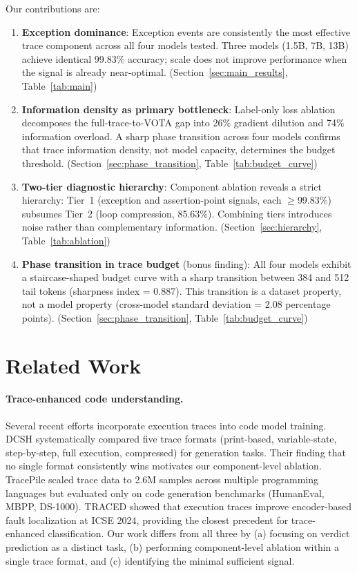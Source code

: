 \documentclass[11pt]{article}
\begin{document}
Our contributions are:
\begin{enumerate}
    \item \textbf{Exception dominance}: Exception events are consistently the most effective trace component across all four models tested. Three models (1.5B, 7B, 13B) achieve identical 99.83\% accuracy; scale does not improve performance when the signal is already near-optimal. (Section~\ref{sec:main_results}, Table~\ref{tab:main})
    \item \textbf{Information density as primary bottleneck}: Label-only loss ablation decomposes the full-trace-to-VOTA gap into 26\% gradient dilution and 74\% information overload. A sharp phase transition across four models confirms that trace information density, not model capacity, determines the budget threshold. (Section~\ref{sec:phase_transition}, Table~\ref{tab:budget_curve})
    \item \textbf{Two-tier diagnostic hierarchy}: Component ablation reveals a strict hierarchy: Tier~1 (exception and assertion-point signals, each $\geq$99.83\%) subsumes Tier~2 (loop compression, 85.63\%). Combining tiers introduces noise rather than complementary information. (Section~\ref{sec:hierarchy}, Table~\ref{tab:ablation})
    \item[\textbf{+}] \textbf{Phase transition in trace budget} (bonus finding): All four models exhibit a staircase-shaped budget curve with a sharp transition between 384 and 512 tail tokens (sharpness index = 0.887). This transition is a dataset property, not a model property (cross-model standard deviation = 2.08 percentage points). (Section~\ref{sec:phase_transition}, Table~\ref{tab:budget_curve})
\end{enumerate}

\section{Related Work}

\paragraph{Trace-enhanced code understanding.}
Several recent efforts incorporate execution traces into code model training. DCSH \citep{dcsh2025} systematically compared five trace formats (print-based, variable-state, step-by-step, full execution, compressed) for generation tasks. Their finding that no single format consistently wins motivates our component-level ablation. TracePile \citep{tracepile2025} scaled trace data to 2.6M samples across multiple programming languages but evaluated only on code generation benchmarks (HumanEval, MBPP, DS-1000). TRACED \citep{traced2024} showed that execution traces improve encoder-based fault localization at ICSE 2024, providing the closest precedent for trace-enhanced classification. Our work differs from all three by (a) focusing on verdict prediction as a distinct task, (b) performing component-level ablation within a single trace format, and (c) identifying the minimal sufficient signal.
\end{document}
